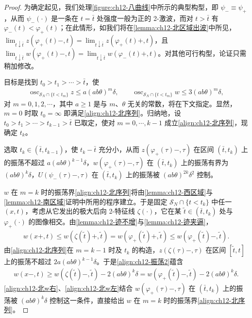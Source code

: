 \documentclass[../../main.tex]{subfiles}
\begin{document}
\begin{proof}
为确定起见，我们处理\cref{figure:ch12-八曲线}中所示的典型构型，即 $\psi_-\equiv\psi_+$，从而 $\psi_-(\cdot)$ 是一条在 $t=\bar t$ 处强度一般为正的 2-激波，而对 $t>\bar t$ 有 $\varphi_-(t)<\varphi_+(t)$；在此情形，如我们将在\cref{lemma:ch12-北区域出波}中所见，$\lim_{t\downarrow\bar t}z(\varphi_+(t)-,t)=\lim_{t\downarrow\bar t}z(\varphi_+(t)+,t)$，且 $\lim_{t\downarrow\bar t}w(\varphi_+(t)-,t)=\lim_{t\downarrow\bar t}w(\varphi_-(t)+,t)$。对其他可行构型，论证只需稍加修改。

目标是找到 $t_0>t_1>\cdots>\bar t$，使
\begin{align}
\operatorname{osc}_{\mathscr{S}_N\cap\{t<t_m\}}z\leqslant a(ab\theta)^m\delta,\qquad
\operatorname{osc}_{\mathscr{S}_N\cap\{t<t_m\}}w\leqslant 3(ab\theta)^m\delta,
\label{align:ch12-北序列}
\end{align}
对 $m=0,1,2,\cdots$，其中 $a\geqslant1$ 是与 $m$、$\theta$ 无关的常数，将在下文指定。显然，$m=0$ 时取 $t_0=\infty$ 即满足\eqref{align:ch12-北序列}。归纳地，设 $t_0>t_1>\cdots>t_{k-1}>\bar t$ 已取定，使对 $m=0,\cdots,k-1$ 成立\eqref{align:ch12-北序列}，现确定 $t_k$。

选取 $t_k\in(\bar t,t_{k-1})$，使 $t_k-\bar t$ 充分小，从而 $z(\varphi_+(\tau)-,\tau)$ 在区间 $(\bar t,t_k)$ 上的振荡不超过 $a(ab\theta)^{k-1}\delta$，$w(\varphi_+(\tau)-,\tau)$ 在 $(\bar t,t_k)$ 上的振荡有界为 $(ab\theta)^k\delta$，$U(\psi_-(\tau)-,\tau)$ 在 $(\bar t,t_k)$ 上的振荡被 $(ab\theta)^{2k}\delta^2$ 控制。

$w$ 在 $m=k$ 时的振荡界\eqref{align:ch12-北序列}将由\cref{lemma:ch12-西区域}与\cref{lemma:ch12-南区域}证明中所用的程序建立。于是固定 $\mathscr{S}_N\cap\{t<t_k\}$ 中任一 $(x,t)$，考虑从它发出的极大后向 2-特征线 $\zeta(\cdot)$，它在某 $\tilde t\in(\bar t,t_k)$ 处与 $\varphi_+(\cdot)$ 的图像相交。由\cref{lemma:ch12-迹不增}与\cref{lemma:ch12-迹夹逼}，
\begin{align}
w(x+,t)\leqslant w(\zeta(\tilde t)+,\tilde t)=w(\varphi_+(\tilde t)+,\tilde t)\leqslant w(\varphi_+(\tilde t)-,\tilde t).
\label{align:ch12-北w右}
\end{align}
由\eqref{align:ch12-北序列}在 $m=k-1$ 时及 $t_k$ 的构造，$z(\zeta(\tau)-,\tau)$ 在区间 $[\tilde t,t]$ 上的振荡不超过 $2a(ab\theta)^{k-1}\delta$。于是\eqref{align:ch12-振荡2}蕴含
\begin{align}
w(x-,t)\geqslant w(\zeta(\tilde t)-,\tilde t)-2(ab\theta)^k\delta=w(\varphi_+(\tilde t)-,\tilde t)-2(ab\theta)^k\delta.
\label{align:ch12-北w左}
\end{align}
\eqref{align:ch12-北w右}、\eqref{align:ch12-北w左}结合 $w(\varphi_+(\tau)-,\tau)$ 在 $(\bar t,t_k)$ 上的振荡被 $(ab\theta)^k\delta$ 控制这一条件，直接给出 $w$ 在 $m=k$ 时的振荡界\eqref{align:ch12-北序列}。


\end{proof}
\end{document}
